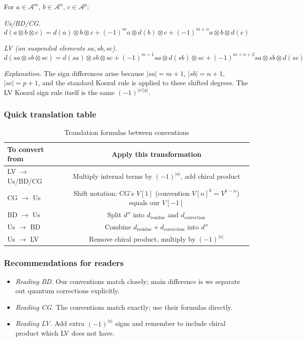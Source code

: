 \begin{example}
For $a \in \mathcal{A}^m$, $b \in \mathcal{A}^n$, $c \in \mathcal{A}^p$:

\emph{Us/BD/CG.}
\[d(a \otimes b \otimes c) = d(a) \otimes b \otimes c + (-1)^m a \otimes d(b) \otimes c
+ (-1)^{m+n} a \otimes b \otimes d(c)\]

\emph{LV (on suspended elements $sa, sb, sc$).}
\[d(sa \otimes sb \otimes sc) = d(sa) \otimes sb \otimes sc + (-1)^{m+1} sa \otimes d(sb) \otimes sc
+ (-1)^{m+n+2} sa \otimes sb \otimes d(sc)\]

\emph{Explanation.} The sign differences arise because $|sa| = m+1$, $|sb| = n+1$, $|sc| = p+1$, and the standard Koszul rule is applied to these shifted degrees. The LV Koszul sign rule itself is the same $(-1)^{|x||y|}$.
\end{example}

\subsubsection{Quick translation table}

\begin{table}[H]
\centering
\caption{Translation formulas between conventions}
\begin{tabular}{|l|c|}
\hline
\textbf{To convert from} & \textbf{Apply this transformation} \\
\hline
\hline
LV $\to$ Us/BD/CG & Multiply internal terms by $(-1)^{|a|}$, add chiral product \\
\hline
CG $\to$ Us & Shift notation: CG's $V[1]$ (convention $V[n]^k = V^{k-n}$) equals our $V[-1]$ \\
\hline
BD $\to$ Us & Split $d''$ into $d_{\text{residue}}$ and $d_{\text{correction}}$ \\
\hline
Us $\to$ BD & Combine $d_{\text{residue}} + d_{\text{correction}}$ into $d''$ \\
\hline
Us $\to$ LV & Remove chiral product, multiply by $(-1)^{|a|}$ \\
\hline
\end{tabular}
\end{table}

\subsubsection{Recommendations for readers}

\begin{itemize}
\item \emph{Reading BD.} Our conventions match closely; main difference is we separate out
quantum corrections explicitly.
\item \emph{Reading CG.} The conventions match exactly; use their formulas directly.
\item \emph{Reading LV.} Add extra $(-1)^{|a|}$ signs and remember to include chiral product
which LV does not have.
\end{itemize}


